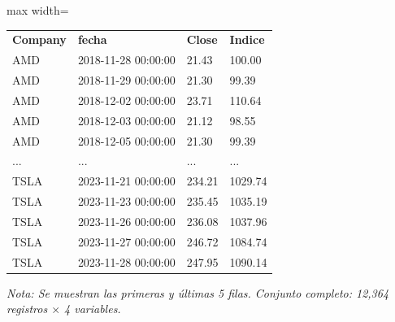 

\begin{table}[htbp]

\centering

\begin{adjustbox}{max width=\textwidth}

\begin{tabular}{llll}

\rowcolor{ThemeBackground}
\rule{0pt}{0.45cm}
\textcolor{ThemeGold}{\bfseries Company} & \textcolor{ThemeGold}{\bfseries fecha} & \textcolor{ThemeGold}{\bfseries Close} & \textcolor{ThemeGold}{\bfseries Indice} \\

AMD & 2018-11-28 00:00:00 & 21.43 & 100.00 \\
AMD & 2018-11-29 00:00:00 & 21.30 & 99.39 \\
AMD & 2018-12-02 00:00:00 & 23.71 & 110.64 \\
AMD & 2018-12-03 00:00:00 & 21.12 & 98.55 \\
AMD & 2018-12-05 00:00:00 & 21.30 & 99.39 \\
... & ... & ... & ... \\
TSLA & 2023-11-21 00:00:00 & 234.21 & 1029.74 \\
TSLA & 2023-11-23 00:00:00 & 235.45 & 1035.19 \\
TSLA & 2023-11-26 00:00:00 & 236.08 & 1037.96 \\
TSLA & 2023-11-27 00:00:00 & 246.72 & 1084.74 \\
TSLA & 2023-11-28 00:00:00 & 247.95 & 1090.14 \\
\bottomrule
\end{tabular}

\end{adjustbox}

\vspace{0.15cm}
{\raggedright\sffamily\footnotesize\color{ThemeMuted}
\textit{Nota: Se muestran las primeras y últimas 5 filas. Conjunto completo: 12,364 registros $\times$ 4 variables.}}

\end{table}
